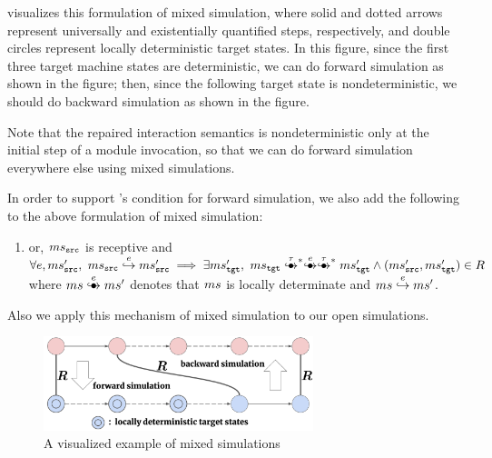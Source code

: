  visualizes this formulation of mixed simulation, where
solid and dotted arrows represent universally and existentially
quantified steps, respectively, and double circles represent locally
deterministic target states. In this figure,
since the first three target machine states are deterministic,
we can do forward simulation as shown in the figure;
then, since the following target state is nondeterministic,
we should do backward simulation as shown in the figure.

Note that the repaired interaction semantics is nondeterministic only
at the initial step of a module invocation, so that we can do
forward simulation everywhere else using mixed simulations.

In order to support \cc{}'s condition for forward simulation,
we also add the following to the above formulation of mixed simulation:
\begin{enumerate}[resume]
\item or, $ms{}_{\texttt{src}{}}$ is receptive and\\
  $\forall e, \mssrc',~ \mssrc \estep{e} \mssrc' \implies {}
  \exists \mstgt',~ \mstgt \exstep{\tau}^{\raisebox{-1mm}{\scriptsize$\ast$}} \exstep{e}\exstep{\tau}^{\raisebox{-1mm}{\scriptsize$\ast$}} \mstgt' \land (\mssrc', \mstgt') \in R$\\
  where $\ms \exstep{e} \ms'$ denotes that $ms$ is locally determinate and $ms \stackrel{e}{\hookrightarrow} ms'$.
\end{enumerate}
Also we apply this mechanism of mixed simulation to our open simulations.

\begin{figure}[t]%
\includegraphics[width=0.7\textwidth]{images/mixed-sim-bold.pdf}
\caption{A visualized example of mixed simulations}
\label{fig:mixedsim}
\end{figure}

